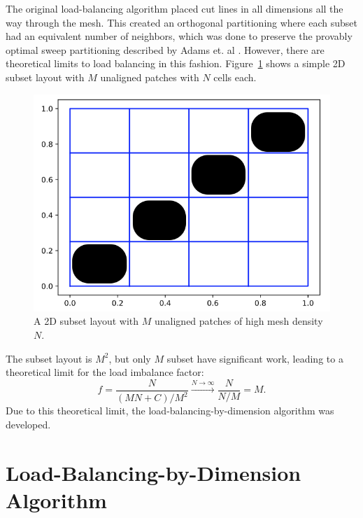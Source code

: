 The original load-balancing algorithm placed cut lines in all dimensions all the way through the mesh.
This created an orthogonal partitioning where each subset had an equivalent number of neighbors, which was done to preserve the provably optimal sweep partitioning described by Adams et. al \cite{mpadams2013,mpadams2015}.
However, there are theoretical limits to load balancing in this fashion. Figure~\ref{2dgeneral} shows a simple 2D subset layout with $M$ unaligned patches with $N$ cells each.

\begin{figure}[H]
\centering
\includegraphics[scale=0.4]{../figures/theoretical_plot.png}
 \caption{A 2D subset layout with $M$ unaligned patches of high mesh density $N$.}
\label{2dgeneral}
\end{figure}
The subset layout is $M^2$, but only $M$ subset have significant work, leading to a theoretical limit for the load imbalance factor:
\begin{equation}
f= \frac{N}{(MN+C)/M^2} \xrightarrow{N\to \infty} \frac{N}{N/M} = M.
\end{equation}
Due to this theoretical limit, the load-balancing-by-dimension algorithm was developed.

\section{Load-Balancing-by-Dimension Algorithm}
\label{sec:lbd}

